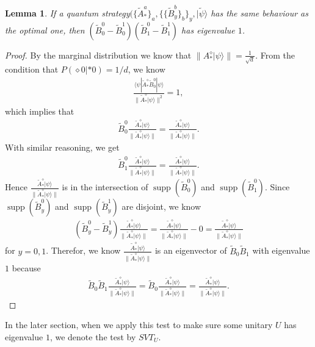 \documentclass[11pt,letterpaper]{article}
\newcommand{\ket}[1]{|#1\rangle}
\newcommand{\bra}[1]{\langle#1|}
\DeclareMathOperator{\supp}{supp}
\newcommand{\1}{\mathbb{1}}
\newcommand{\SVT}{SVT}
\newcommand{\tA}{\tilde{A}}
\newcommand{\tB}{\tilde{B}}
\newcommand{\tpsi}{\tilde{\psi}}
\newtheorem{lemma}[theorem]{Lemma}
\theoremstyle{definition}
\begin{document}
\begin{lemma}
	\label{lm:svt_comp}
	If a quantum strategy$(\{\tA_\ast^a\}_a, \{\{\tB_y^b\}_b\}_y, \ket{\tpsi}$ has the same behaviour as
	the optimal one, then $(\tB_0^0 - \tB_0^1)(\tB_1^0-\tB_1^1)$ has eigenvalue $1$.
\end{lemma}
\begin{proof}
By the marginal distribution we know that $\| A_\ast^\diamond \ket{\psi}\| = \frac{1}{\sqrt{d}}$.
From the condition that $P(\diamond 0|\ast 0) = 1/d$, we know
\begin{align}
	\frac{  \bra{\psi} \tA_\ast^\diamond  \tB_0^0 \ket{\psi}}{\| \tA_\ast^\diamond \ket{\psi}\|^2} = 1,
\end{align}
which implies that 
\begin{align}
 \tB_0^0 \frac{\tA_\ast^\diamond \ket{\psi}}{\| \tA_\ast^\diamond \ket{\psi}\|} = \frac{\tA_\ast^\diamond \ket{\psi}}{\| \tA_\ast^\diamond \ket{\psi}\|}.
\end{align}
With similar reasoning, we get
\begin{align}
 \tB_1^0 \frac{\tA_\ast^\diamond \ket{\psi}}{\| \tA_\ast^\diamond \ket{\psi}\|} = \frac{\tA_\ast^\diamond \ket{\psi}}{\| \tA_\ast^\diamond \ket{\psi}\|}.
\end{align}
Hence $ \frac{\tA_\ast^\diamond \ket{\psi}}{\| \tA_\ast^\diamond \ket{\psi}\|} $ is in the intersection of $\supp(\tB_0^0)$ and $\supp(\tB_1^0)$.
Since $\supp(\tB_y^0)$ and $\supp(\tB_y^1)$ are disjoint, we know
\begin{align*}
	(\tB_y^0 - \tB_y^1)  \frac{\tA_\ast^\diamond \ket{\psi}}{\| \tA_\ast^\diamond \ket{\psi}\|}  =  \frac{\tA_\ast^\diamond \ket{\psi}}{\| \tA_\ast^\diamond \ket{\psi}\|} - 0 = \frac{\tA_\ast^\diamond \ket{\psi}}{\| \tA_\ast^\diamond \ket{\psi}\|} 
\end{align*}
for $y = 0,1$.
Therefor, we know $ \frac{\tA_\ast^\diamond \ket{\psi}}{\| \tA_\ast^\diamond \ket{\psi}\|} $ is an eigenvector of $\tB_0\tB_1$ with eigenvalue $1$ because
\begin{align}
	\tB_0\tB_1 \frac{\tA_\ast^\diamond \ket{\psi}}{\| \tA_\ast^\diamond \ket{\psi}\|} = \tB_0 \frac{\tA_\ast^\diamond \ket{\psi}}{\| \tA_\ast^\diamond \ket{\psi}\|} =  \frac{\tA_\ast^\diamond \ket{\psi}}{\| \tA_\ast^\diamond \ket{\psi}\|}.
\end{align}
\end{proof}
In the later section, when we apply this test to make sure some unitary $U$ has eigenvalue $1$, 
we denote the test by $\SVT_U$.
\end{document}
